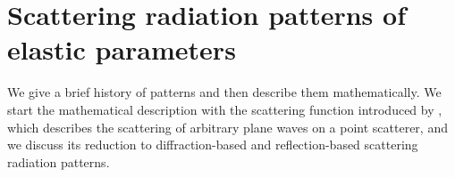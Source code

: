\section{Scattering radiation patterns of elastic parameters}

We give a brief history of patterns and then describe them mathematically.
We start the mathematical description with the scattering function introduced by \cite{eaton1994}, which describes the scattering of arbitrary plane waves on a point scatterer, and we discuss its reduction to diffraction-based 
\citep{wu1985,tarantola1986} and reflection-based 
\citep{gholami20131,alkhalifah2014} scattering radiation patterns.









